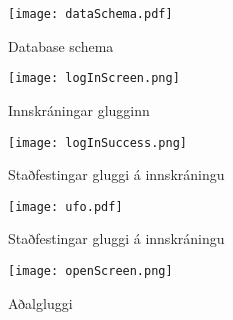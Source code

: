 \documentclass[12pt, git, final]{rureport}
\begin{document}
\begin{figure}
	\centering 
	\texttt{[image: dataSchema.pdf]}
	\caption{Database schema \label{fig:dataschema}}
\end{figure} 
%
\begin{figure}
	\centering 
	\texttt{[image: logInScreen.png]}
	\caption{Innskráningar glugginn \label{fig:logScreen}}
\end{figure} 

\begin{figure}
	\centering 
	\texttt{[image: logInSuccess.png]}
	\caption{Staðfestingar gluggi á innskráningu \label{fig:logsucces}}
\end{figure} 

\begin{figure}
	\centering 
	\texttt{[image: ufo.pdf]}
	\caption{Staðfestingar gluggi á innskráningu \label{fig:diagram}}
\end{figure}

\begin{figure}[t]
	\centering 
	\texttt{[image: openScreen.png]}
	\caption{Aðalgluggi \label{fig:openScreen}}
\end{figure} 

\clearpage

\printbibliography
\end{document}
